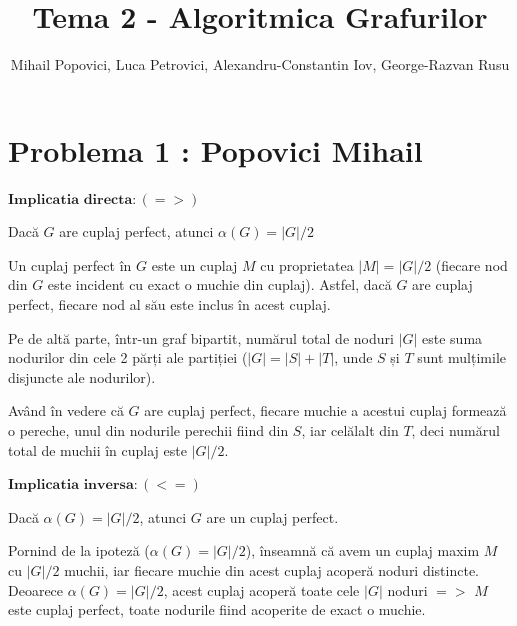\documentclass{article}
\title{Tema 2 - Algoritmica Grafurilor}
\author{Mihail Popovici, Luca Petrovici, Alexandru-Constantin Iov, George-Razvan Rusu}
\begin{document}
\maketitle

\section*{\fontsize{20}{50}\selectfont Problema 1 : Popovici Mihail}

{\fontsize{14}{16}\selectfont 
$\mathbf{Implicatia}$ $\mathbf{directa: (=>)}$ 
\par Dacă $G$ are cuplaj perfect, atunci $\alpha(G) = |G|/2$
\\
\par Un cuplaj perfect în $G$ este un cuplaj $M$ cu proprietatea $|M| = |G|/2$ (fiecare nod din $G$ este incident cu exact o muchie din cuplaj). Astfel, dacă $G$ are cuplaj perfect, fiecare nod al său este inclus în acest cuplaj. 
\par Pe de altă parte, într-un graf bipartit, numărul total de noduri $|G|$ este suma nodurilor din cele 2 părți ale partiției ($|G| = |S| + |T|$, unde $S$ și $T$ sunt mulțimile disjuncte ale nodurilor).
\par Având în vedere că $G$ are cuplaj perfect, fiecare muchie a acestui cuplaj formează o pereche, unul din nodurile perechii fiind din $S$, iar celălalt din $T$, deci numărul total de muchii în cuplaj este $|G|/2$.

\bigskip
$\mathbf{Implicatia}$ $\mathbf{inversa: (<=)}$ 
\par Dacă $\alpha(G) = |G|/2$, atunci $G$ are un cuplaj perfect.
\\

\par Pornind de la ipoteză ($\alpha(G) = |G|/2$), înseamnă că avem un cuplaj maxim $M$ cu $|G|/2$ muchii, iar fiecare muchie din acest cuplaj acoperă noduri distincte. Deoarece $\alpha(G) = |G|/2$, acest cuplaj acoperă toate cele $|G|$ noduri $=>$ $M$ este cuplaj perfect, toate nodurile fiind acoperite de exact o muchie. 

}
\end{document}
